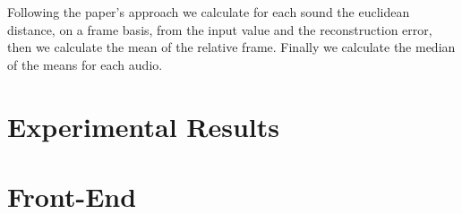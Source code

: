\documentclass[10pt]{article}
\begin{document}
	Following the paper's approach we calculate for each sound the euclidean distance, on a frame basis, from the input value and the reconstruction error, then we calculate the mean of the relative frame. Finally we calculate the median of the means for each audio.
	
	
	\section{Experimental Results}	
	\section{Front-End}	
\end{document}

